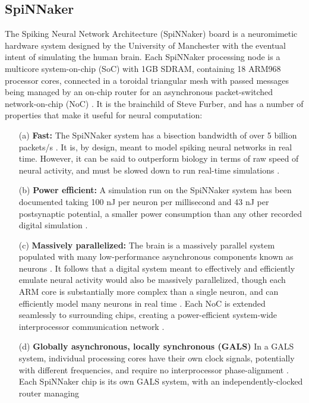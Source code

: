 \documentclass[journal]{./sty/IEEEtran}
\begin{document}
\subsection{SpiNNaker}
The Spiking Neural Network Architecture (SpiNNaker) board is a neuromimetic hardware 
system designed by the University of Manchester with the eventual intent of simulating 
the human brain. Each SpiNNaker processing node is a multicore system-on-chip (SoC) 
with 1GB SDRAM, containing 18 ARM968 processor cores, connected in a toroidal triangular 
mesh with passed messages being managed by an on-chip router for an asynchronous 
packet-switched network-on-chip (NoC) \cite{GALS:Plana}.
It is the brainchild of Steve Furber, and has a number of properties that make it 
useful for neural computation:
\begin{itemize}
\item[(a)]{\bf Fast:}
The SpiNNaker system has a bisection bandwidth of over 5 billion 
packets/s \cite{ArchOverV:Furber}. It is, by design, meant to model spiking neural networks 
in real time. However, it can be said to outperform biology in terms of raw speed of neural activity, 
and must be slowed down to run real-time simulations \cite{ArchOverV:Furber, Fast:Rast}.
\item[(b)]{\bf Power efficient:} A simulation run on the SpiNNaker system has been documented taking 100 nJ per neuron per 
millisecond and 43 nJ per postsynaptic potential, a smaller power consumption than any other 
recorded digital simulation \cite{Efficient:Sharp}.
\item[(c)] {\bf Massively parallelized:} The brain is a massively parallel system populated with many low-performance asynchronous components 
known as neurons \cite{BioMPA:Furber}. It follows that a digital system meant to effectively and 
efficiently emulate neural activity would also be massively parallelized, though each ARM core is 
substantially more complex than a single neuron, and can efficiently model many neurons in 
real time \cite{ArchOverV:Furber}. Each NoC is extended seamlessly to surrounding chips, 
creating a power-efficient system-wide interprocessor communication network \cite{GALS:Plana}.
\item[(d)]{\bf Globally asynchronous, locally synchronous (GALS)} In a GALS system, individual processing cores have their own clock signals, potentially 
with different frequencies, and require no interprocessor phase-alignment \cite{GALS:Plana}. 
Each SpiNNaker chip is its own GALS system, with an independently-clocked router managing 

\end{itemize}
\end{document}
